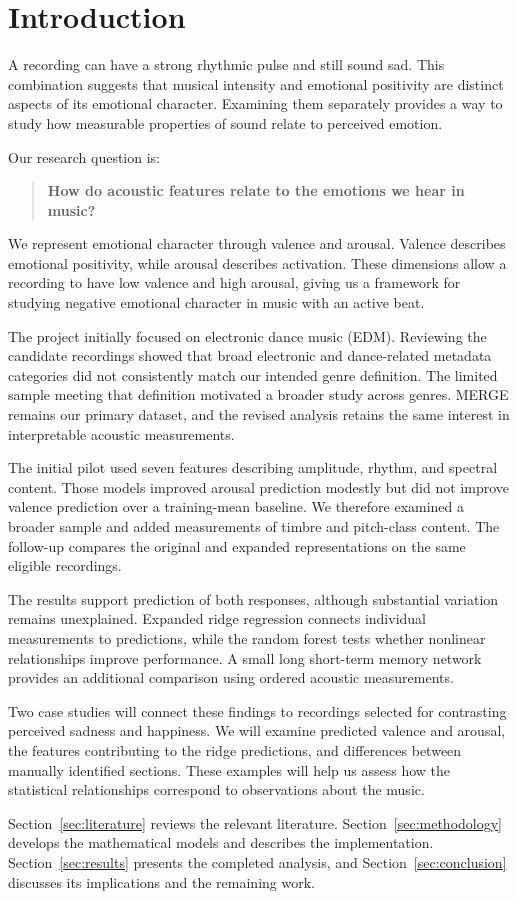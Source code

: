 \section{Introduction}
\label{sec:introduction}

A recording can have a strong rhythmic pulse and still sound sad. This combination suggests that musical intensity and emotional positivity are distinct aspects of its emotional character. Examining them separately provides a way to study how measurable properties of sound relate to perceived emotion.

Our research question is:
\begin{quote}
\textbf{How do acoustic features relate to the emotions we hear in music?}
\end{quote}

We represent emotional character through valence and arousal. Valence describes emotional positivity, while arousal describes activation. These dimensions allow a recording to have low valence and high arousal, giving us a framework for studying negative emotional character in music with an active beat.

The project initially focused on electronic dance music (EDM). Reviewing the candidate recordings showed that broad electronic and dance-related metadata categories did not consistently match our intended genre definition. The limited sample meeting that definition motivated a broader study across genres. MERGE remains our primary dataset, and the revised analysis retains the same interest in interpretable acoustic measurements.

The initial pilot used seven features describing amplitude, rhythm, and spectral content. Those models improved arousal prediction modestly but did not improve valence prediction over a training-mean baseline. We therefore examined a broader sample and added measurements of timbre and pitch-class content. The follow-up compares the original and expanded representations on the same eligible recordings.

The results support prediction of both responses, although substantial variation remains unexplained. Expanded ridge regression connects individual measurements to predictions, while the random forest tests whether nonlinear relationships improve performance. A small long short-term memory network provides an additional comparison using ordered acoustic measurements.

Two case studies will connect these findings to recordings selected for contrasting perceived sadness and happiness. We will examine predicted valence and arousal, the features contributing to the ridge predictions, and differences between manually identified sections. These examples will help us assess how the statistical relationships correspond to observations about the music.

Section~\ref{sec:literature} reviews the relevant literature. Section~\ref{sec:methodology} develops the mathematical models and describes the implementation. Section~\ref{sec:results} presents the completed analysis, and Section~\ref{sec:conclusion} discusses its implications and the remaining work.
